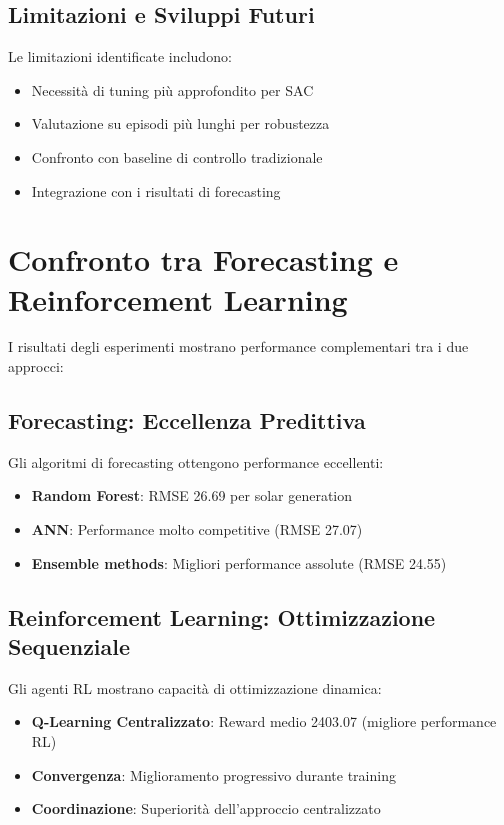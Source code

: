 \documentclass[12pt,a4paper,twoside]{report}
\begin{document}
\subsection{Limitazioni e Sviluppi Futuri}

Le limitazioni identificate includono:
\begin{itemize}
    \item Necessità di tuning più approfondito per SAC
    \item Valutazione su episodi più lunghi per robustezza
    \item Confronto con baseline di controllo tradizionale
    \item Integrazione con i risultati di forecasting
\end{itemize}


\section{Confronto tra Forecasting e Reinforcement Learning}

I risultati degli esperimenti mostrano performance complementari tra i due approcci:

\subsection{Forecasting: Eccellenza Predittiva}
Gli algoritmi di forecasting ottengono performance eccellenti:
\begin{itemize}
    \item \textbf{Random Forest}: RMSE 26.69 per solar generation
    \item \textbf{ANN}: Performance molto competitive (RMSE 27.07)
    \item \textbf{Ensemble methods}: Migliori performance assolute (RMSE 24.55)
\end{itemize}

\subsection{Reinforcement Learning: Ottimizzazione Sequenziale}
Gli agenti RL mostrano capacità di ottimizzazione dinamica:
\begin{itemize}
    \item \textbf{Q-Learning Centralizzato}: Reward medio 2403.07 (migliore performance RL)
    \item \textbf{Convergenza}: Miglioramento progressivo durante training
    \item \textbf{Coordinazione}: Superiorità dell'approccio centralizzato
\end{itemize}
\end{document}

